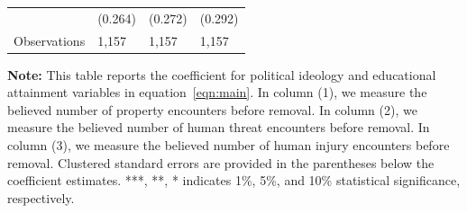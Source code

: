 \documentclass[english,12pt]{article}
\begin{document}
\begin{table}[H]
\begin{tabular}{@{}llll@{}}
                    &     (0.264)   &     (0.272)   &     (0.292)   \\
        Observations & 1,157    &  1,157       & 1,157        \\\bottomrule
    \end{tabular}
    \begin{minipage}{.9\textwidth} 
            \vspace{1em}
    \footnotesize{{\bf{Note:}} This table reports the coefficient for political ideology and educational attainment variables in equation~\ref{eqn:main}. In column (1), we measure the believed number of property encounters before removal. In column (2), we measure the believed number of human threat encounters before removal. In column (3), we measure the believed number of human injury encounters before removal. Clustered standard errors are provided in the parentheses below the coefficient estimates. ***, **, * indicates 1\%, 5\%, and 10\% statistical significance, respectively.}
    \label{tab: bel_edu}
    \end{minipage}
\end{table}
\end{document}
